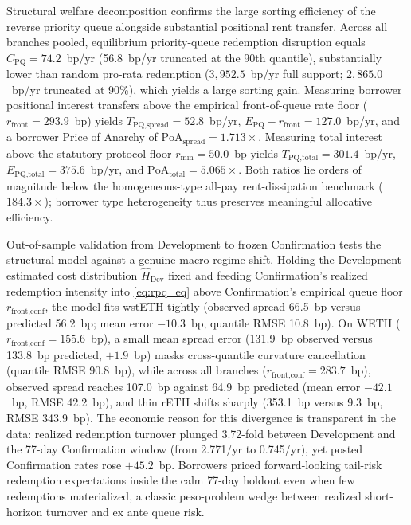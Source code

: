 Structural welfare decomposition confirms the large sorting efficiency of the reverse priority queue alongside substantial positional rent transfer. Across all branches pooled, equilibrium priority-queue redemption disruption equals $C_{\text{PQ}} = 74.2$~bp/yr (56.8~bp/yr truncated at the 90th quantile), substantially lower than random pro-rata redemption ($3{,}952.5$~bp/yr full support; $2{,}865.0$~bp/yr truncated at 90\%), which yields a large sorting gain. Measuring borrower positional interest transfers above the empirical front-of-queue rate floor ($r_{\text{front}} = 293.9$~bp) yields $T_{\text{PQ,spread}} = 52.8$~bp/yr, $E_{\text{PQ}} - r_{\text{front}} = 127.0$~bp/yr, and a borrower Price of Anarchy of $\text{PoA}_{\text{spread}} = 1.713\times$. Measuring total interest above the statutory protocol floor $r_{\min} = 50.0$~bp yields $T_{\text{PQ,total}} = 301.4$~bp/yr, $E_{\text{PQ,total}} = 375.6$~bp/yr, and $\text{PoA}_{\text{total}} = 5.065\times$. Both ratios lie orders of magnitude below the homogeneous-type all-pay rent-dissipation benchmark ($184.3\times$); borrower type heterogeneity thus preserves meaningful allocative efficiency.

Out-of-sample validation from Development to frozen Confirmation tests the structural model against a genuine macro regime shift. Holding the Development-estimated cost distribution $\hat{H}_{\text{Dev}}$ fixed and feeding Confirmation's realized redemption intensity into \eqref{eq:rpq_eq} above Confirmation's empirical queue floor $r_{\text{front,conf}}$, the model fits wstETH tightly (observed spread 66.5~bp versus predicted 56.2~bp; mean error $-10.3$~bp, quantile RMSE 10.8~bp). On WETH ($r_{\text{front,conf}} = 155.6$~bp), a small mean spread error (131.9~bp observed versus 133.8~bp predicted, $+1.9$~bp) masks cross-quantile curvature cancellation (quantile RMSE 90.8~bp), while across all branches ($r_{\text{front,conf}} = 283.7$~bp), observed spread reaches 107.0~bp against 64.9~bp predicted (mean error $-42.1$~bp, RMSE 42.2~bp), and thin rETH shifts sharply (353.1~bp versus 9.3~bp, RMSE 343.9~bp). The economic reason for this divergence is transparent in the data: realized redemption turnover plunged 3.72-fold between Development and the 77-day Confirmation window (from 2.771/yr to 0.745/yr), yet posted Confirmation rates rose $+45.2$~bp. Borrowers priced forward-looking tail-risk redemption expectations inside the calm 77-day holdout even when few redemptions materialized, a classic peso-problem wedge between realized short-horizon turnover and ex ante queue risk.

